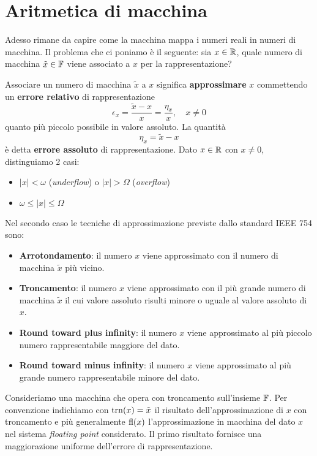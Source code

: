 \section{Aritmetica di macchina}
Adesso rimane da capire come la macchina mappa i numeri reali in numeri di macchina. Il problema che ci
poniamo è il seguente: sia $x \in \mathbb{R}$, quale numero di macchina $\tilde{x} \in \mathbb{F}$ viene associato a $x$
per la rappresentazione?

Associare un numero di macchina $\tilde{x}$ a $x$ significa \textbf{approssimare} $x$ commettendo un
\textbf{errore relativo} di rappresentazione
\[ \epsilon_x = \frac{\tilde{x} - x}{x} = \frac{\eta_x}{x}, \quad x \neq 0 \]
quanto più piccolo possibile in valore assoluto. La quantità
\[ \eta_x = \tilde{x} - x \]
è detta \textbf{errore assoluto} di rappresentazione. Dato $x \in \mathbb{R}$ con $x \neq 0$, distinguiamo 2 casi:
\begin{itemize}
	\item $|x| < \omega$ (\emph{underflow}) o $|x| > \Omega$ (\emph{overflow})
	\item $\omega \leq |x| \leq \Omega$
\end{itemize}
Nel secondo caso le tecniche di approssimazione previste dallo standard IEEE 754 sono:
\begin{itemize}
	\item \textbf{Arrotondamento}: il numero $x$ viene approssimato con il numero di macchina $\tilde{x}$
	      più vicino.
	\item \textbf{Troncamento}: il numero $x$ viene approssimato con il più grande numero di macchina
	      $\tilde{x}$ il cui valore assoluto risulti minore o uguale al valore assoluto di $x$.
	\item \textbf{Round toward plus infinity}: il numero $x$ viene approssimato al più piccolo numero
	      rappresentabile maggiore del dato.
	\item \textbf{Round toward minus infinity}: il numero $x$ viene approssimato al più grande numero
	      rappresentabile minore del dato.
\end{itemize}
Consideriamo una macchina che opera con troncamento sull'insieme $\mathbb{F}$. Per convenzione indichiamo con
$\operatorname{trn}(x) = \tilde{x}$ il risultato dell'approssimazione di $x$ con troncamento e più generalmente $\operatorname{fl}(x)$
l'approssimazione in macchina del dato $x$ nel sistema \emph{floating point} considerato. Il primo risultato
fornisce una maggiorazione uniforme dell'errore di rappresentazione.

